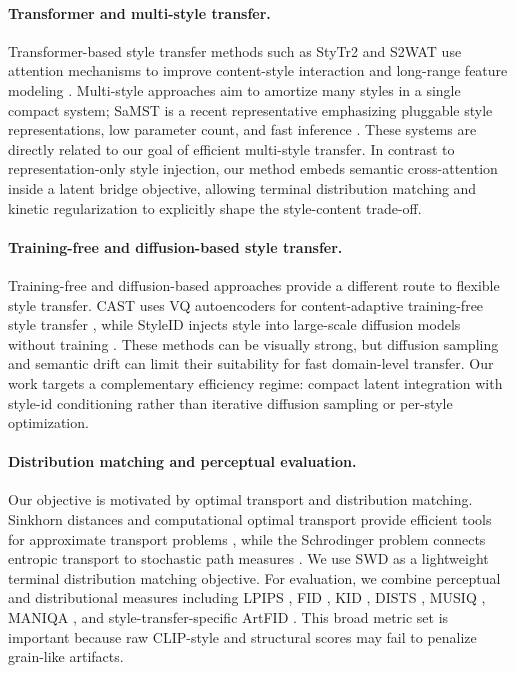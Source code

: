 ﻿\documentclass{article}
\begin{document}
\paragraph{Transformer and multi-style transfer.}
Transformer-based style transfer methods such as StyTr2 and S2WAT use attention mechanisms to improve content-style interaction and long-range feature modeling \cite{deng2022stytr2,xia2024s2wat}. Multi-style approaches aim to amortize many styles in a single compact system; SaMST is a recent representative emphasizing pluggable style representations, low parameter count, and fast inference \cite{liu2024samst}. These systems are directly related to our goal of efficient multi-style transfer. In contrast to representation-only style injection, our method embeds semantic cross-attention inside a latent bridge objective, allowing terminal distribution matching and kinetic regularization to explicitly shape the style-content trade-off.

\paragraph{Training-free and diffusion-based style transfer.}
Training-free and diffusion-based approaches provide a different route to flexible style transfer. CAST uses VQ autoencoders for content-adaptive training-free style transfer \cite{gim2024cast}, while StyleID injects style into large-scale diffusion models without training \cite{chung2024styleid}. These methods can be visually strong, but diffusion sampling and semantic drift can limit their suitability for fast domain-level transfer. Our work targets a complementary efficiency regime: compact latent integration with style-id conditioning rather than iterative diffusion sampling or per-style optimization.

\paragraph{Distribution matching and perceptual evaluation.}
Our objective is motivated by optimal transport and distribution matching. Sinkhorn distances and computational optimal transport provide efficient tools for approximate transport problems \cite{cuturi2013sinkhorn,peyre2019computational}, while the Schrodinger problem connects entropic transport to stochastic path measures \cite{leonard2014survey}. We use SWD as a lightweight terminal distribution matching objective. For evaluation, we combine perceptual and distributional measures including LPIPS \cite{zhang2018lpips}, FID \cite{heusel2017fid}, KID \cite{binkowski2018kid}, DISTS \cite{ding2020dists}, MUSIQ \cite{ke2021musiq}, MANIQA \cite{yang2022maniqa}, and style-transfer-specific ArtFID \cite{wright2022artfid}. This broad metric set is important because raw CLIP-style and structural scores may fail to penalize grain-like artifacts.
\end{document}

